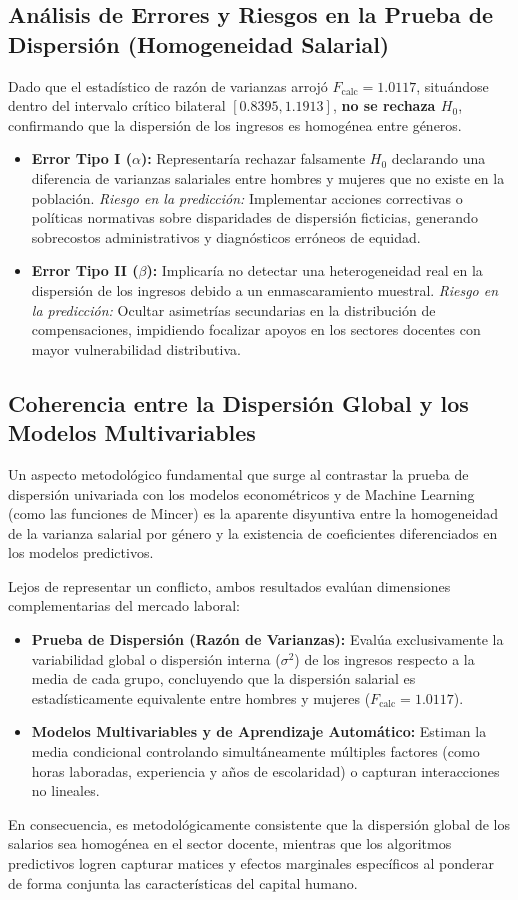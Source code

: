 \documentclass[10pt,twocolumn,a4paper]{article}
\begin{document}
\subsection{Análisis de Errores y Riesgos en la Prueba de Dispersión (Homogeneidad Salarial)}
Dado que el estadístico de razón de varianzas arrojó $F_{\text{calc}} = 1.0117$, situándose dentro del intervalo crítico bilateral $[0.8395, 1.1913]$, \textbf{no se rechaza $H_0$}, confirmando que la dispersión de los ingresos es homogénea entre géneros.
\begin{itemize}
    \item \textbf{Error Tipo I ($\alpha$):} Representaría rechazar falsamente $H_0$ declarando una diferencia de varianzas salariales entre hombres y mujeres que no existe en la población. \textit{Riesgo en la predicción:} Implementar acciones correctivas o políticas normativas sobre disparidades de dispersión ficticias, generando sobrecostos administrativos y diagnósticos erróneos de equidad.
    \item \textbf{Error Tipo II ($\beta$):} Implicaría no detectar una heterogeneidad real en la dispersión de los ingresos debido a un enmascaramiento muestral. \textit{Riesgo en la predicción:} Ocultar asimetrías secundarias en la distribución de compensaciones, impidiendo focalizar apoyos en los sectores docentes con mayor vulnerabilidad distributiva.
\end{itemize}

\subsection{Coherencia entre la Dispersión Global y los Modelos Multivariables}
Un aspecto metodológico fundamental que surge al contrastar la prueba de dispersión univariada con los modelos econométricos y de Machine Learning (como las funciones de Mincer) es la aparente disyuntiva entre la homogeneidad de la varianza salarial por género y la existencia de coeficientes diferenciados en los modelos predictivos. 

Lejos de representar un conflicto, ambos resultados evalúan dimensiones complementarias del mercado laboral:
\begin{itemize}
    \item \textbf{Prueba de Dispersión (Razón de Varianzas):} Evalúa exclusivamente la variabilidad global o dispersión interna ($\sigma^2$) de los ingresos respecto a la media de cada grupo, concluyendo que la dispersión salarial es estadísticamente equivalente entre hombres y mujeres ($F_{\text{calc}} = 1.0117$).
    \item \textbf{Modelos Multivariables y de Aprendizaje Automático:} Estiman la media condicional controlando simultáneamente múltiples factores (como horas laboradas, experiencia y años de escolaridad) o capturan interacciones no lineales. 
\end{itemize}
En consecuencia, es metodológicamente consistente que la dispersión global de los salarios sea homogénea en el sector docente, mientras que los algoritmos predictivos logren capturar matices y efectos marginales específicos al ponderar de forma conjunta las características del capital humano.
\end{document}
